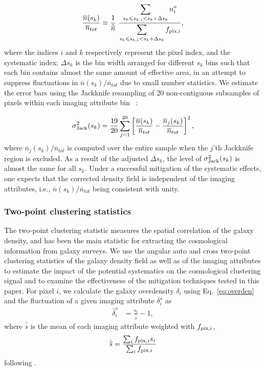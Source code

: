 \documentclass[fleqn, usenatbib]{mnras}
\begin{document}
\begin{equation}\label{eq:nnbar_stat}
    \frac{\overline{n}(s_{k})}{\overline{n}_{tot}} \equiv \frac{1}{\hat{\overline{n}}}~ \frac{\displaystyle\sum_{s_{k}\leq s_{k,i}<s_{k}+\Delta s_{k}} n^{o}_{i}}{\displaystyle\sum_{s_{k}\leq s_{k,i}<s_{k}+\Delta s_{k}} f_{\rm pix, i}},
\end{equation}
where the indices $i$ and $k$ respectively represent the pixel index, and the systematic index; $\Delta s_{k}$ is the bin width arranged for different $s_k$ bins such that each bin contains almost the same amount of effective area, in an attempt to suppress fluctuations in $\overline{n}(s_{k})/\overline{n}_{tot}$ due to small number statistics. We estimate the error bars using the Jackknife resampling of 20 non-contiguous subsamples of pixels within each imaging attribute bin ~\citep[see e.g.][]{ross2011ameliorating}:


\begin{equation}\label{eq:error_jack}
    \sigma^{2}_{{\rm Jack}}(s_{k}) = \frac{19}{20}\sum_{j=1}^{20} \left[    \frac{\overline{n}(s_{k})}{\overline{n}_{tot}} -     \frac{\overline{n}_{j}(s_{k})}{\overline{n}_{tot}}\right]^{2}  ,
\end{equation}
 where $\overline{n}_{j}(s_{k})/\overline{n}_{tot}$ is computed over the entire sample when the $j$'th Jackknife region is excluded.
As a result of the adjusted $\Delta s_{k}$, the level of $\sigma^{2}_{{\rm Jack}}(s_k)$ is almost the same for all $s_k$. Under a successful mitigation of the systematic effects, one expects that the corrected density field is independent of the imaging attributes, i.e., $\overline{n}(s_{k})/\overline{n}_{tot}$ being consistent with unity.


\subsubsection{Two-point clustering statistics}
The two-point clustering statistic measures the spatial correlation of the galaxy density, and has been the main statistic for extracting the cosmological information from galaxy surveys. We use the angular auto and cross two-point clustering statistics of the galaxy density field as well as of the imaging attributes to estimate the impact of the potential systematics on the cosmological clustering signal and to examine the effectiveness of the mitigation techniques tested in this paper. For pixel $i$, we calculate the galaxy overdensity $\delta_{i}$ using Eq.~\ref{eq:overden} and the fluctuation of a given imaging attribute $\delta^{s}_{i}$ as
\begin{align}\label{eq:delta}
    \hat{\delta}^{s}_{i} &= \frac{s_{i}}{\hat{\overline{s}}} - 1 ,
\end{align}
where $\hat{\overline{s}}$ is the mean of each imaging attribute weighted with $f_{{\rm pix},i}$,
\begin{align}\label{eq:deltasysbar}
\hat{\overline{s}} = \frac{\sum_i f_{{\rm pix},i} s_i}{\sum_i f_{{\rm pix},i}}
\end{align}
following \citet{ross2011ameliorating}.\\
\end{document}

